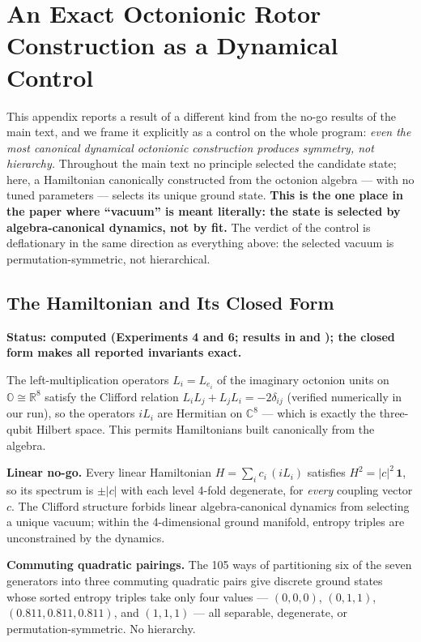 \documentclass[11pt]{article}
\newcommand{\CC}{\mathbb{C}}
\newcommand{\RR}{\mathbb{R}}
\newcommand{\OO}{\mathbb{O}}
\begin{document}
\appendix

\section{An Exact Octonionic Rotor Construction as a Dynamical Control}
\label{sec:rotor}

This appendix reports a result of a different kind from the no-go results of the main text, and we frame it explicitly as a control on the whole program: \emph{even the most canonical dynamical octonionic construction produces symmetry, not hierarchy.} Throughout the main text no principle selected the candidate state; here, a Hamiltonian canonically constructed from the octonion algebra --- with no tuned parameters --- selects its unique ground state. \textbf{This is the one place in the paper where ``vacuum'' is meant literally: the state is selected by algebra-canonical dynamics, not by fit.} The verdict of the control is deflationary in the same direction as everything above: the selected vacuum is permutation-symmetric, not hierarchical.

\subsection{The Hamiltonian and Its Closed Form}
\label{sec:closedform}

\textbf{Status: computed (Experiments 4 and 6; results in  and ); the closed form makes all reported invariants exact.}

The left-multiplication operators $L_i = L_{e_i}$ of the imaginary octonion units on $\OO \cong \RR^8$ satisfy the Clifford relation $L_i L_j + L_j L_i = -2\delta_{ij}$ (verified numerically in our run), so the operators $iL_i$ are Hermitian on $\CC^8$ --- which is exactly the three-qubit Hilbert space. This permits Hamiltonians built canonically from the algebra.

\textbf{Linear no-go.} Every linear Hamiltonian $H = \sum_i c_i\,(iL_i)$ satisfies $H^2 = |c|^2\,\mathbf{1}$, so its spectrum is $\pm|c|$ with each level 4-fold degenerate, for \emph{every} coupling vector $c$. The Clifford structure forbids linear algebra-canonical dynamics from selecting a unique vacuum; within the 4-dimensional ground manifold, entropy triples are unconstrained by the dynamics.

\textbf{Commuting quadratic pairings.} The 105 ways of partitioning six of the seven generators into three commuting quadratic pairs give discrete ground states whose sorted entropy triples take only four values --- $(0, 0, 0)$, $(0, 1, 1)$, $(0.811, 0.811, 0.811)$, and $(1, 1, 1)$ --- all separable, degenerate, or permutation-symmetric. No hierarchy.
\end{document}

